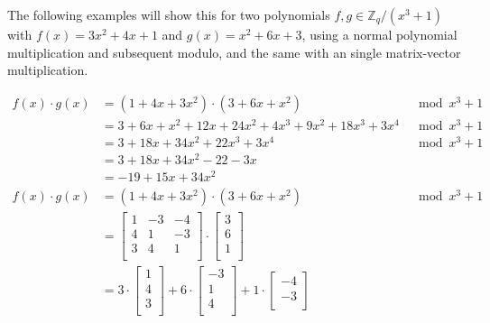 The following examples will show this for two polynomials $f, g \in \mathbb{Z}_q/(x^3+1)$ with $f(x) = 3x^2+4x+1$ and $g(x) = x^2+6x+3$, using a normal polynomial multiplication and subsequent modulo, and the same with an single matrix-vector multiplication.

\begin{align*}
  f(x)\cdot g(x) & = (1+4x+3x^2) \cdot (3+6x+x^2)                & \mod x^3+1 \\
                 & = 3+6x+x^2 + 12x+24x^2+4x^3 + 9x^2+18x^3+3x^4 & \mod x^3+1 \\
                 & = 3+18x+34x^2+22x^3+3x^4                      & \mod x^3+1 \\
                 & = 3+18x+34x^2-22-3x                           &            \\
                 & = -19+15x+34x^2                               &            \\
  f(x)\cdot g(x) & = (1+4x+3x^2) \cdot (3+6x+x^2)                & \mod x^3+1 \\
                 & = {
  \begin{bmatrix}
    1 & -3 & -4 \\
    4 & 1  & -3 \\
    3 & 4  & 1  \\
  \end{bmatrix}
  \cdot 
  \begin{bmatrix}
    3 \\
    6 \\
    1 \\
  \end{bmatrix} }                                                             \\
                 & = {
  3 \cdot \begin{bmatrix}
            1 \\
            4 \\
            3 \\
          \end{bmatrix}
  + 6 \cdot   \begin{bmatrix}
                -3 \\
                1  \\
                4  \\
              \end{bmatrix}
  + 1 \cdot   \begin{bmatrix}
                -4 \\
                -3 \\

\end{bmatrix}}
\end{align*}

